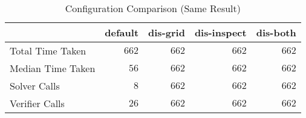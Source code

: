 \begin{table}[htp]
\caption{Configuration Comparison (Same Result)}
\label{Ta:configuration_comparison_same}
\begin{center}

\def\arraystretch{1.1}
\setlength\tabcolsep{7pt}

\begin{tabular}{|l|r|r|r|r|}
\hline

\multicolumn{1}{|c|}{} & \multicolumn{1}{|c|}{\textbf{default}} & \multicolumn{1}{|c|}{\textbf{dis-grid}} & \multicolumn{1}{|c|}{\textbf{dis-inspect}} & \multicolumn{1}{|c|}{\textbf{dis-both}} \\ \hline \hline
Total Time Taken & $662$ & $662$ & $662$ & $662$\\ \hline
Median Time Taken & $56$ & $662$ & $662$ & $662$\\ \hline
Solver Calls & $8$ & $662$ & $662$ & $662$\\ \hline
Verifier Calls & $26$ & $662$ & $662$ & $662$\\ \hline

\end{tabular}

\end{center}
\end{table}
